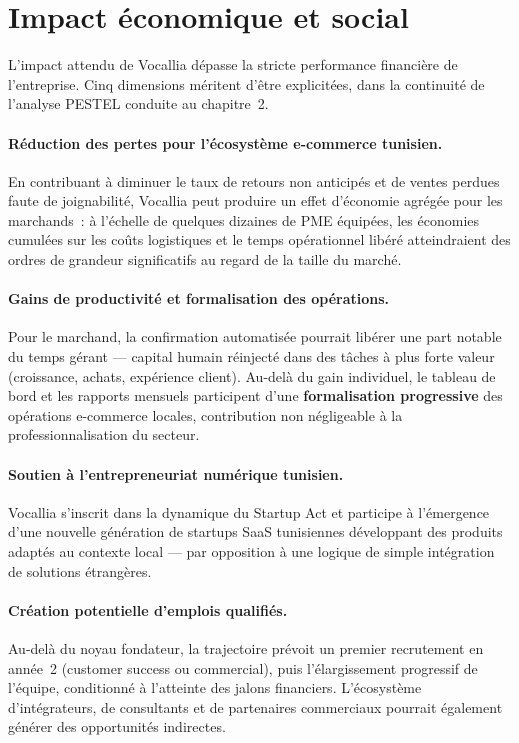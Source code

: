 \section{Impact économique et social}
\label{sec:impact_economique_social}

L'impact attendu de Vocallia dépasse la stricte performance financière de l'entreprise. Cinq dimensions méritent d'être explicitées, dans la continuité de l'analyse PESTEL conduite au chapitre~2.

\paragraph{Réduction des pertes pour l'écosystème e-commerce tunisien.} En contribuant à diminuer le taux de retours non anticipés et de ventes perdues faute de joignabilité, Vocallia peut produire un effet d'économie agrégée pour les marchands~: à l'échelle de quelques dizaines de PME équipées, les économies cumulées sur les coûts logistiques et le temps opérationnel libéré atteindraient des ordres de grandeur significatifs au regard de la taille du marché.

\paragraph{Gains de productivité et formalisation des opérations.} Pour le marchand, la confirmation automatisée pourrait libérer une part notable du temps gérant — capital humain réinjecté dans des tâches à plus forte valeur (croissance, achats, expérience client). Au-delà du gain individuel, le tableau de bord et les rapports mensuels participent d'une \textbf{formalisation progressive} des opérations e-commerce locales, contribution non négligeable à la professionnalisation du secteur.

\paragraph{Soutien à l'entrepreneuriat numérique tunisien.} Vocallia s'inscrit dans la dynamique du Startup Act et participe à l'émergence d'une nouvelle génération de startups SaaS tunisiennes développant des produits adaptés au contexte local — par opposition à une logique de simple intégration de solutions étrangères.

\paragraph{Création potentielle d'emplois qualifiés.} Au-delà du noyau fondateur, la trajectoire prévoit un premier recrutement en année~2 (customer success ou commercial), puis l'élargissement progressif de l'équipe, conditionné à l'atteinte des jalons financiers. L'écosystème d'intégrateurs, de consultants et de partenaires commerciaux pourrait également générer des opportunités indirectes.

